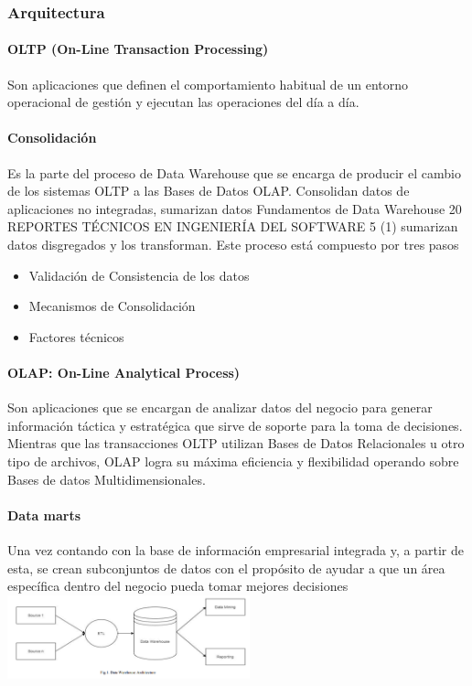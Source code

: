 \documentclass[twoside,twocolumn]{article}
\begin{document}
\subsubsection{Arquitectura}
\paragraph{OLTP (On-Line Transaction Processing) }
Son aplicaciones que definen el comportamiento habitual de un entorno operacional de gestión y ejecutan las operaciones del día a día.
\paragraph{Consolidación }
Es la parte del proceso de Data Warehouse que se encarga de producir el cambio de los sistemas OLTP a las Bases de Datos OLAP. Consolidan datos de aplicaciones no integradas, sumarizan datos Fundamentos de Data Warehouse 20 REPORTES TÉCNICOS EN INGENIERÍA DEL SOFTWARE 5 (1) sumarizan datos disgregados y los transforman. Este proceso está compuesto por tres pasos
\begin{itemize}
    \item  Validación de Consistencia de los datos
    \item  Mecanismos de Consolidación
    \item  Factores técnicos
\end{itemize}
\paragraph{OLAP: On-Line Analytical Process)}
Son aplicaciones que se encargan de analizar datos del negocio para generar información táctica y estratégica que sirve de soporte para la toma de decisiones. Mientras que las transacciones OLTP utilizan Bases de Datos Relacionales u otro tipo de archivos, OLAP logra su máxima eficiencia y flexibilidad operando sobre Bases de datos Multidimensionales.
\paragraph{Data marts}
Una vez contando con la base de información empresarial integrada y, a partir de esta, se crean subconjuntos de datos con el propósito de ayudar a que un área específica dentro del negocio pueda tomar mejores decisiones
\includegraphics[width=7cm]{imagenes/imagen1.png}
\end{document}
